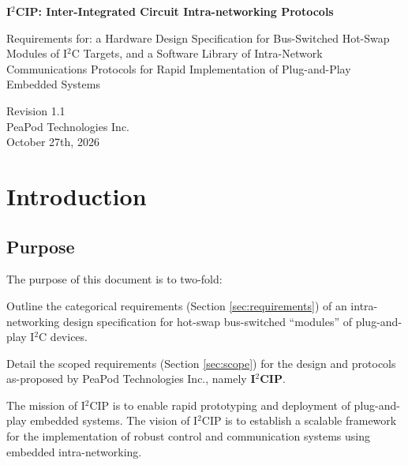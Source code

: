 \documentclass{../tex/report}
\begin{document}
\begin{titlepage}
    \begin{center}
        \vspace*{1.2cm}

        \textbf{\large{I${}^2$CIP: Inter-Integrated Circuit Intra-networking Protocols}}

        \vspace{0.5cm}

        Requirements for: a Hardware Design Specification for Bus-Switched Hot-Swap Modules of I${}^2$C Targets, and a Software Library of Intra-Network Communications Protocols for Rapid Implementation of Plug-and-Play Embedded Systems\\

        \vfill
        
        \vspace{1.25cm}

        Revision 1.1\\
        PeaPod Technologies Inc.\\
        October 27th, 2026

    \end{center}
\end{titlepage}

\thispagestyle{plain}

\tableofcontents
\newpage

\section{Introduction}\label{sec:intro}

\subsection{Purpose}\label{sec:purpose}

The purpose of this document is to two-fold:

\hspace{24pt} Outline the categorical requirements (Section \ref{sec:requirements}) of an intra-networking design specification for hot-swap bus-switched ``modules'' of plug-and-play I${}^2$C devices.

\hspace{24pt} Detail the scoped requirements (Section \ref{sec:scope}) for the design and protocols as-proposed by PeaPod Technologies Inc., namely \textbf{I${}^2$CIP}.

\hspace{24pt} The mission of I${}^2$CIP is to enable rapid prototyping and deployment of plug-and-play embedded systems. The vision of I${}^2$CIP is to establish a scalable framework for the implementation of robust control and communication systems using embedded intra-networking.
\end{document}
